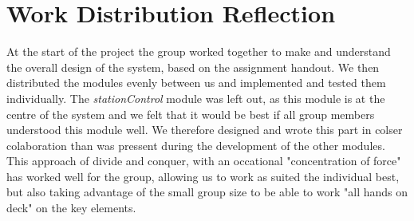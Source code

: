 \section{Work Distribution Reflection}

At the start of the project the group worked together to make and understand the overall design of the system, based on the assignment handout. We then distributed the modules evenly between us and implemented and tested them individually. The \textit{stationControl} module was left out, as this module is at the centre of the system and we felt that it would be best if all group members understood this module well. We therefore designed and wrote this part in colser colaboration than was pressent during the development of the other modules.\\

This approach of divide and conquer, with an occational "concentration of force" has worked well for the group, allowing us to work as suited the individual best, but also taking advantage of the small group size to be able to work "all hands on deck" on the key elements.

\newpage